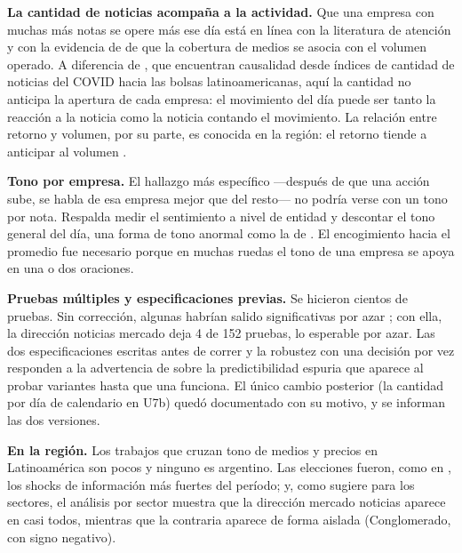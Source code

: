 \textbf{La cantidad de noticias acompaña a la actividad.} Que una empresa con muchas más notas
se opere más ese día está en línea con la literatura de atención \citep{da2011,fang2009,cao2025hype}
y con la evidencia de \citet{engelberg2011} de que la cobertura de medios se asocia con el
volumen operado. A diferencia de \citet{coronado2022,coronado2023}, que encuentran causalidad
desde índices de cantidad de noticias del COVID hacia las bolsas latinoamericanas, aquí la
cantidad no anticipa la apertura de cada empresa: el movimiento del día puede ser tanto la
reacción a la noticia como la noticia contando el movimiento. La relación entre retorno y
volumen, por su parte, es conocida en la región: el retorno tiende a anticipar al volumen
\citep{rojas2015}.

\textbf{Tono por empresa.} El hallazgo más específico —después de que una acción sube, se habla
de esa empresa mejor que del resto— no podría verse con un tono por nota. Respalda medir el
sentimiento a nivel de entidad \citep{tang2023finentity,sinha2023sentfin} y descontar el tono
general del día, una forma de tono anormal como la de \citet{ardia2022}. El encogimiento hacia
el promedio \citep{efron1975,carbo2026} fue necesario porque en muchas ruedas el tono de una
empresa se apoya en una o dos oraciones.

\textbf{Pruebas múltiples y especificaciones previas.} Se hicieron cientos de pruebas. Sin
corrección, algunas habrían salido significativas por azar \citep{harvey2016,harvey2020}; con
ella, la dirección noticias \flecha{} mercado deja 4 de 152 pruebas, lo esperable por azar. Las
dos especificaciones escritas antes de correr y la robustez con una decisión por vez responden
a la advertencia de \citet{nikolopoulos2026} sobre la predictibilidad espuria que aparece al
probar variantes hasta que una funciona. El único cambio posterior (la cantidad por día de
calendario en U7b) quedó documentado con su motivo, y se informan las dos versiones.

\textbf{En la región.} Los trabajos que cruzan tono de medios y precios en Latinoamérica son
pocos \citep{galdi2018,cruzmontana2025} y ninguno es argentino. Las elecciones fueron, como en
\citet{calandroni2026}, los shocks de información más fuertes del período; y, como sugiere
\citet{amburgey2025} para los sectores, el análisis por sector muestra que la dirección mercado
\flecha{} noticias aparece en casi todos, mientras que la contraria aparece de forma aislada
(Conglomerado, con signo negativo).
